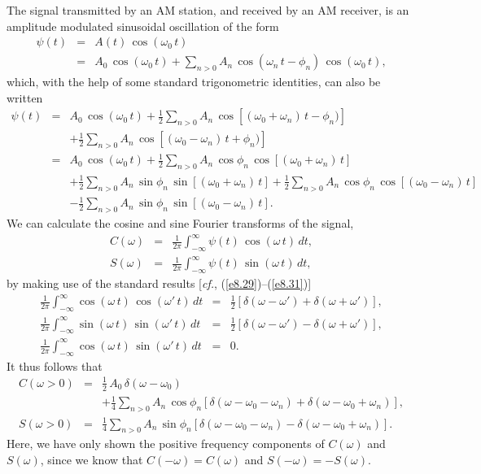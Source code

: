 The signal transmitted by an AM station, and received by an AM receiver, is  an
amplitude modulated sinusoidal oscillation of the form
\begin{eqnarray}
\psi(t) &=& A(t)\,\cos(\omega_0\,t)\nonumber\\[0.5ex]
&=&A_0\,\cos(\omega_0\,t)+\sum_{n>0} A_n\,\cos(\omega_n\,t-\phi_n)\,\cos(\omega_0\,t),
\end{eqnarray}
which, with the help of some standard trigonometric identities, can also be written
\begin{eqnarray}
\psi(t) &=&A_0\,\cos(\omega_0\,t)+\frac{1}{2}\sum_{n>0}A_n\,\cos[(\omega_0+\omega_n)\,t-\phi_n)]\nonumber\\[0.5ex]&&
+ \frac{1}{2}\sum_{n>0}A_n\,\cos[(\omega_0-\omega_n)\,t+\phi_n)]\nonumber\\[0.5ex]
&=&A_0\,\cos(\omega_0\,t)+\frac{1}{2}\sum_{n>0}A_n\,\cos\phi_n\,\cos[(\omega_0+\omega_n)\,t]\nonumber\\[0.5ex]&&
+\frac{1}{2}\sum_{n>0}A_n\,\sin\phi_n\,\sin[(\omega_0+\omega_n)\,t]+\frac{1}{2}\sum_{n>0}A_n\,\cos\phi_n\,\cos[(\omega_0-\omega_n)\,t]\nonumber\\[0.5ex]&&
-\frac{1}{2}\sum_{n>0}A_n\,\sin\phi_n\,\sin[(\omega_0-\omega_n)\,t].
\end{eqnarray}
We can calculate the cosine and sine Fourier transforms of the signal,
\begin{eqnarray}
C(\omega) &=& \frac{1}{2\pi}\int_{-\infty}^\infty \psi(t)\,\cos(\omega\,t)\,dt,\\[0.5ex]
S(\omega) &=& \frac{1}{2\pi}\int_{-\infty}^\infty \psi(t)\,\sin(\omega\,t)\,dt,
\end{eqnarray}
by making use of the standard results [{\em cf.}, (\ref{e8.29})--(\ref{e8.31})]
\begin{eqnarray}
\frac{1}{2\pi}\int_{-\infty}^\infty \cos(\omega\,t)\,\cos(\omega'\,t)\,dt&=&
\frac{1}{2}\left[\delta(\omega-\omega') + \delta (\omega+\omega')\right],\\[0.5ex]
\frac{1}{2\pi}\int_{-\infty}^\infty \sin(\omega\,t)\,\sin(\omega'\,t)\,dt&=&
\frac{1}{2}\left[\delta(\omega-\omega') - \delta (\omega+\omega')\right],\\[0.5ex]
\frac{1}{2\pi}\int_{-\infty}^\infty \cos(\omega\,t)\,\sin(\omega'\,t)\,dt&=&
0.
\end{eqnarray}
It thus follows that
\begin{eqnarray}\label{e8.65}
C(\omega>0)& =& \frac{1}{2}\,A_0\,\delta(\omega-\omega_0)\nonumber \\[0.5ex]
&&+ \frac{1}{4}\sum_{n>0} A_n\,\cos\phi_n\left[\delta(\omega-\omega_0-\omega_n) + \delta(\omega-\omega_0+\omega_n)\right],\\[0.5ex]
S(\omega>0) &=& \frac{1}{4}\sum_{n>0} A_n\,\sin\phi_n\left[\delta(\omega-\omega_0-\omega_n) - \delta(\omega-\omega_0+\omega_n)\right].\label{e8.66}
\end{eqnarray}
Here, we have only shown the positive frequency components of $C(\omega)$ and
$S(\omega)$, since we know that $C(-\omega)=C(\omega)$ and $S(-\omega)=-S(\omega)$.

